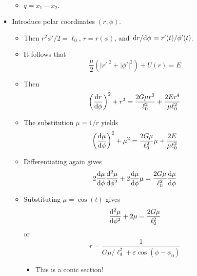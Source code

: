 \documentclass[../notes.tex]{subfiles}
\begin{document}
\begin{itemize}
\begin{align*}
    \end{align*}
    \begin{itemize}
        \item $q=x_1-x_2$.
    \end{itemize}
    \item Introduce polar coordinates $(r,\phi)$.
    \begin{itemize}
        \item Then $r^2\phi'/2=\ell_0$, $r=r(\phi)$, and $\dv*{r}{\phi}=r'(t)/\phi'(t)$.
        \item It follows that
        \begin{equation*}
            \frac{\mu}{2}(|r'|^2+|\phi'|^2)+U(r) = E
        \end{equation*}
        \item Then
        \begin{equation*}
            \left( \dv{r}{\phi} \right)^2+r^2 = \frac{2G\mu r^3}{\ell_0^2}+\frac{2Er^4}{\mu\ell_0^2}
        \end{equation*}
        \item The substitution $\mu=1/r$ yields
        \begin{equation*}
            \left( \dv{\mu}{\phi} \right)^2+\mu^2 = \frac{2G\mu}{\ell_0^2}\mu+\frac{2E}{\mu\ell_0^2}
        \end{equation*}
        \item Differentiating again gives
        \begin{equation*}
            2\dv{\mu}{\phi}\dv[2]{\mu}{\phi}+2\dv{\mu}{\phi}\mu = \frac{2G\mu}{\ell_0^2}\dv{\mu}{\phi}
        \end{equation*}
        \item Substituting $\mu=\cos(t)$ gives
        \begin{equation*}
            \dv[2]{\mu}{\phi}+2\mu = \frac{2G\mu}{\ell_0^2}
        \end{equation*}
        or
        \begin{equation*}
            r = \frac{1}{G\mu/\ell_0^2+\varepsilon\cos(\phi-\phi_0)}
        \end{equation*}
        \begin{itemize}
            \item This is a conic section!
        \end{itemize}
    \end{itemize}
\end{itemize}
\end{document}
